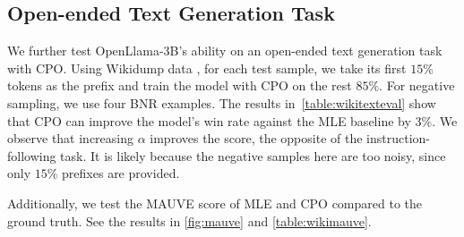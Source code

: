 \begin{table}[tb]
\centering 
\caption{OpenLlama-3B's win rate against the ground truth continuation on Wikidump. The model is trained with either MLE or CPO+BNR. Weight ensemble is adopted. The best CPO model outperforms the MLE baseline by 3\% win rate.}
\vspace{-0.5em}
\vspace{-0.5em}
\label{table:wikitexteval}
\end{table}



\subsection{Open-ended Text Generation Task}
We further test OpenLlama-3B's ability on an open-ended text generation task with CPO. Using Wikidump data \citep{wikidump}, for each test sample, we take its first $15\%$ tokens as the prefix and train the model with CPO on the rest $85\%$. For negative sampling, we use four BNR examples. The results in~\cref{table:wikitexteval} show that 
CPO can improve the model's win rate against the MLE baseline by $3\%$. 
We observe that increasing $\alpha$ improves the score, the opposite of the instruction-following task. It is likely because the negative samples here are too noisy, since only $15\%$ prefixes are provided.

Additionally, we test the MAUVE score \citep{pillutla2021mauve} of MLE and CPO compared to the ground truth. See the results in \cref{fig:mauve} and \cref{table:wikimauve}.

